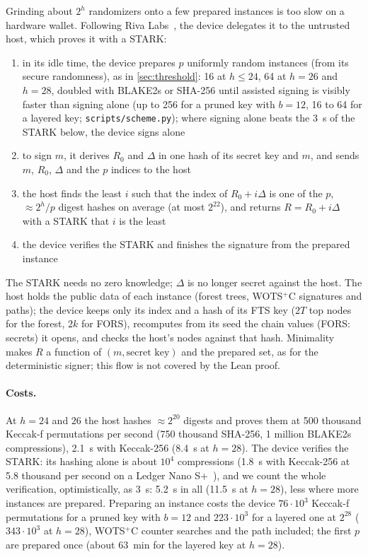 \documentclass[11pt]{article}
\begin{document}
Grinding about $2^h$ randomizers onto a few prepared instances is too slow on a hardware wallet. Following Riva
Labs~\cite{riva}, the device delegates it to the untrusted host, which proves it with a STARK:
\begin{enumerate}
  \item in its idle time, the device prepares $p$ uniformly random instances (from its secure randomness), as in
        \cref{sec:threshold}: 16 at $h\le24$, 64 at $h=26$ and $h=28$, doubled with BLAKE2s or SHA-256 until
        assisted signing is visibly faster than signing alone (up to 256 for a pruned key with $b=12$, 16 to 64 for a layered key;
        \texttt{scripts/scheme.py}); where signing alone beats the 3~s of the STARK below, the device signs alone
  \item to sign $m$, it derives $R_0$ and $\Delta$ in one hash of its secret key and $m$, and sends $m$, $R_0$,
        $\Delta$ and the $p$ indices to the host
  \item the host finds the least $i$ such that the index of $R_0 + i\Delta$ is one of the $p$, $\approx2^h/p$
        digest hashes on average (at most $2^{22}$), and returns $R = R_0 + i\Delta$ with
        a STARK that $i$ is the least
  \item the device verifies the STARK and finishes the signature from the prepared instance
\end{enumerate}
The STARK needs no zero knowledge; $\Delta$ is no longer secret against the host. The host holds the public data of
each instance (forest trees, WOTS$^+$C signatures and paths); the device keeps only its index and a hash of its FTS
key ($2T$ top nodes for the forest, $2k$ for FORS), recomputes from its seed the chain values (FORS: secrets) it opens,
and checks the host's nodes against that hash.
Minimality makes $R$ a function of $(m, \text{secret key})$ and the prepared set, as for the deterministic signer;
this flow is not covered by the Lean proof.

\paragraph{Costs.} At $h=24$ and $26$ the host hashes $\approx2^{20}$ digests and proves them at 500 thousand Keccak-f
permutations per second (750 thousand SHA-256, 1 million BLAKE2s compressions), 2.1~s with Keccak-256 (8.4~s at $h=28$).
The device verifies the STARK: its hashing alone is about $10^4$ compressions (1.8~s with Keccak-256 at 5.8 thousand
per second on a Ledger Nano S+~\cite{hwbench}), and we count the whole verification, optimistically, as 3~s: 5.2~s in all (11.5~s at $h=28$), less where more
instances are prepared. Preparing an instance costs the device $76\cdot10^3$ Keccak-f permutations for a pruned
key with $b=12$ and $223\cdot10^3$ for a layered one at $2^{28}$ ($343\cdot10^3$
at $h=28$), WOTS$^+$C counter searches and the path included; the first $p$ are prepared once (about 63~min for
the layered key at $h=28$).
\end{document}
